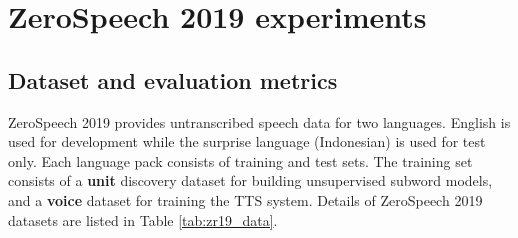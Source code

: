 \documentclass[a4paper]{article}
\begin{document}




\label{subsec:zs2017_results}

\section{ZeroSpeech 2019 experiments}
\subsection{Dataset and evaluation metrics}
ZeroSpeech 2019 \cite{dunbar2019zero} provides untranscribed speech data for two languages. English is used for development while the surprise language (Indonesian) \cite{sakti2008development_ococosda,sakti2008development_tcast} is used for test only. Each language pack consists of training and test sets. The training set consists of a \textbf{unit} discovery dataset for building unsupervised subword models, and a \textbf{voice} dataset for training the TTS system. 
Details of ZeroSpeech 2019 datasets are listed in Table \ref{tab:zr19_data}.
\begin{table}[h]
\renewcommand\arraystretch{0.60}
\centering
\caption{ZeroSpeech 2019 datasets}
\label{tab:zr19_data}
\end{table}
\end{document}
